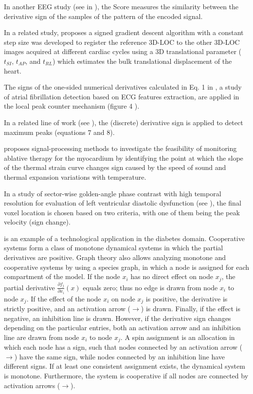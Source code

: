 \documentclass[11pt]{book}
\begin{document}
In another EEG study (see in \cite{molina2013ecg}), the \textquotedbl Score\textquotedbl{} measures the similarity between the derivative
sign of the samples of the pattern of the encoded signal.

In a related study, \cite{moghari2014three} proposes a signed gradient descent algorithm with a constant step size was
developed to register the reference 3D-LOC
to the other 3D-LOC images acquired at different cardiac cycles using
a 3D translational parameter ($t_{SI}$, $t_{AP}$, and $t_{RL}$)
which estimates the bulk translational displacement of the heart.

The signs of the one-sided numerical derivatives calculated
in Eq. 1 in \cite{soudani2018atrial}, a study of atrial fibrillation detection based on ECG features
extraction, are applied in the local peak
counter mechanism (figure 4 ).

In a related line of work (see \cite{meddah2019fpga}), the (discrete) derivative
sign is applied to detect maximum peaks (equations 7 and 8).

\cite{seo2010monitoring} proposes  signal-processing methods to investigate
the feasibility of monitoring ablative therapy for the myocardium
by identifying the point at which the slope of the thermal strain
curve changes sign caused by the speed of sound and thermal expansion
variations with temperature. 

In a study of sector-wise golden-angle phase contrast with high temporal
resolution for evaluation of left ventricular diastolic dysfunction (see \cite{fyrdahl2020sector}), the final voxel location is chosen based on two criteria, with one of them
being the peak velocity (sign change).

\cite{de2012prediction} is an example of a technological application
in the diabetes domain. Cooperative systems form a class of monotone
dynamical systems in which the partial derivatives are positive. Graph
theory also allows analyzing monotone and cooperative systems by using
a species graph, in which a node is assigned for each compartment
of the model. If the node $x_{i}$ has no direct effect on node $x_{j}$,
the partial derivative $\frac{\partial f_{j}}{\partial x_{i}}\left(x\right)$
equals zero; thus no edge is drawn from node $x_{i}$ to node $x_{j}$.
If the effect of the node $x_{i}$ on node $x_{j}$ is positive, the
derivative is strictly positive, and an activation arrow ($\rightarrow$)
is drawn. Finally, if the effect is negative, an inhibition line is
drawn. However, if the derivative sign changes depending on the particular
entries, both an activation arrow and an inhibition line are drawn
from node $x_{i}$ to node $x_{j}$. A spin assignment is an allocation
in which each node has a sign, such that nodes connected by an activation
arrow ($\rightarrow$) have the same sign, while nodes connected by
an inhibition line have different signs. If at least one consistent
assignment exists, the dynamical system is monotone. Furthermore,
the system is cooperative if all nodes are connected by activation
arrows ($\rightarrow$).
\end{document}
